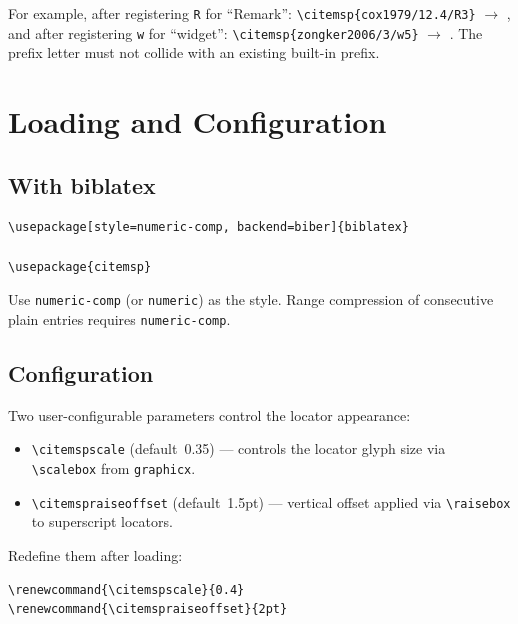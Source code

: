 \documentclass[11pt, a4paper]{article}
\newcommand{\pkg}[1]{\texttt{#1}}
\newcommand{\cmd}[1]{\texttt{\textbackslash #1}}
\begin{document}
%
\noindent For example, after registering \texttt{R} for ``Remark'':
\verb|\citemsp{cox1979/12.4/R3}| $\longrightarrow$ ,\enspace
and after registering \texttt{w} for ``widget'':
\verb|\citemsp{zongker2006/3/w5}| $\longrightarrow$ .\enspace
The prefix letter must not collide with an existing built-in prefix.


\section{Loading and Configuration}

\subsection*{With biblatex}

\begin{tcolorbox}[colback=gray!5, colframe=gray!40, boxrule=0.5pt, arc=2pt, top=6pt, bottom=6pt, left=10pt, right=10pt]
\begin{verbatim}
\usepackage[style=numeric-comp, backend=biber]{biblatex}

\usepackage{citemsp}
\end{verbatim}
\end{tcolorbox}

\noindent Use \texttt{numeric-comp} (or \texttt{numeric}) as the style. Range compression of consecutive plain entries requires \texttt{numeric-comp}.

\subsection*{Configuration}

Two user-configurable parameters control the locator appearance:
\begin{itemize}[leftmargin=2em]
  \item \cmd{citemspscale} (default~0.35) --- controls the locator glyph
    size via \cmd{scalebox} from \pkg{graphicx}.
  \item \cmd{citemspraiseoffset} (default~1.5pt) --- vertical offset
    applied via \cmd{raisebox} to superscript locators.
\end{itemize}

\noindent Redefine them after loading:

\begin{tcolorbox}[colback=gray!5, colframe=gray!40, boxrule=0.5pt, arc=2pt, top=6pt, bottom=6pt, left=10pt, right=10pt]
\begin{verbatim}
\renewcommand{\citemspscale}{0.4}
\renewcommand{\citemspraiseoffset}{2pt}
\end{verbatim}
\end{tcolorbox}
\end{document}
